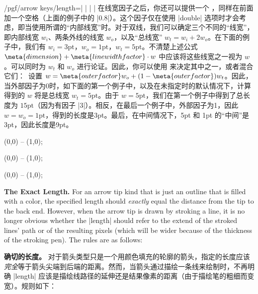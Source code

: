 \begin{key}{/pgf/arrow keys/length=| |%
        | |}
    在线宽因子之后，你还可以提供一个 ，同样在前面加一个空格（上面的例子中的 |0.8|）。这个因子仅在使用 |double| 选项时才会考虑，即当使用所谓的“内部线宽”时。对于双线，我们可以确定三个不同的“线宽”，即内部线宽 $w_i$、两条外线的线宽 $w_o$，以及“总线宽” $w_t = w_i + 2w_o$。在下面的例子中，我们有 $w_i = 3\mathrm{pt}$，$w_o=1\mathrm{pt}$，$w_t = 5\mathrm{pt}$。不清楚上述公式 $\meta{dimension} + \meta{line width factor}\cdot w$ 中应该将这些线宽之一视为 $w$。可以同时为 $w_t$ 和 $w_o$ 进行论证。因此，你可以使用  来决定其中之一，或者混合它们：\tikzname\ 设置 $w = \meta{outer factor} w_o + (1-\meta{outer factor})w_t$。因此，当外部因子为0时，如下面的第一个例子中，以及在未指定时的默认情况下，计算得到的 $w$ 将是总线宽 $w_t = 5\mathrm{pt}$。由于 $w=5\mathrm{pt}$，我们在第一个例子中得到了总长度为 $15\mathrm{pt}$（因为有因子 |3|）。相反，在最后一个例子中，外部因子为1，因此 $w = w_o = \mathrm{1pt}$，得到的长度是3pt。最后，在中间情况下，5pt 和 1pt 的“中间”是3pt，因此长度是9pt。


\begin{codeexample}[preamble={\usetikzlibrary{arrows.meta}}]
\tikz \draw [line width=1pt, double distance=3pt,
             arrows = {-Latex[length=0pt 3 0]}] (0,0) -- (1,0);
\end{codeexample}
\begin{codeexample}[preamble={\usetikzlibrary{arrows.meta}}]
\tikz \draw [line width=1pt, double distance=3pt,
             arrows = {-Latex[length=0pt 3 .5]}] (0,0) -- (1,0);
\end{codeexample}
\begin{codeexample}[preamble={\usetikzlibrary{arrows.meta}}]
\tikz \draw [line width=1pt, double distance=3pt,
             arrows = {-Latex[length=0pt 3 1]} ] (0,0) -- (1,0);
\end{codeexample}

    \medskip
    \noindent \textbf{The Exact Length.}
    For an arrow tip kind that is just an outline that is filled with a color,
    the specified length should \emph{exactly} equal the distance from the tip
    to the back end. However, when the arrow tip is drawn by stroking a line,
    it is no longer obvious whether the |length| should refer to the extend of
    the stroked lines' path or of the resulting pixels (which will be wider
    because of the thickness of the stroking pen). The rules are as follows:
    
    \noindent \textbf{确切的长度。} 对于箭头类型只是一个用颜色填充的轮廓的箭头，指定的长度应该\emph{完全}等于箭头尖端到后端的距离。然而，当箭头通过描绘一条线来绘制时，不再明确 |length| 应该是描绘线路径的延伸还是结果像素的距离（由于描绘笔的粗细而变宽）。规则如下：



\end{key}
